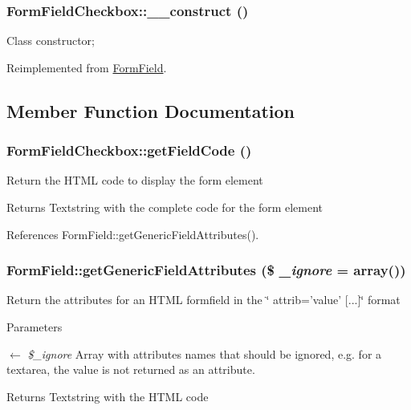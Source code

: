 \subsubsection[{\_\-\_\-construct}]{\setlength{\rightskip}{0pt plus 5cm}FormFieldCheckbox::\_\-\_\-construct ()}\label{classFormFieldCheckbox_a9ea37cd03013e361f11680049c1a0097}
Class constructor; 

Reimplemented from \hyperlink{classFormField_a0cfe713ce28a6a0cb53476ed463e1f01}{FormField}.



\subsection{Member Function Documentation}
\subsubsection[{getFieldCode}]{\setlength{\rightskip}{0pt plus 5cm}FormFieldCheckbox::getFieldCode ()}\label{classFormFieldCheckbox_aaa7647c07d938553d8bec7afa869ebc0}
Return the HTML code to display the form element

\begin{DoxyReturn}{Returns}
Textstring with the complete code for the form element 
\end{DoxyReturn}


References FormField::getGenericFieldAttributes().

\subsubsection[{getGenericFieldAttributes}]{\setlength{\rightskip}{0pt plus 5cm}FormField::getGenericFieldAttributes (\$ {\em \_\-ignore} = {\ttfamily array()})}\label{classFormField_a9f9d136ba8b4a793f22370aff43d592d}
Return the attributes for an HTML formfield in the \char`\"{} attrib='value' \mbox{[}...\mbox{]}\char`\"{} format


\begin{DoxyParams}{Parameters}
\item[\mbox{$\leftarrow$} {\em \$\_\-ignore}]Array with attributes names that should be ignored, e.g. for a textarea, the value is not returned as an attribute. \end{DoxyParams}
\begin{DoxyReturn}{Returns}
Textstring with the HTML code 
\end{DoxyReturn}


